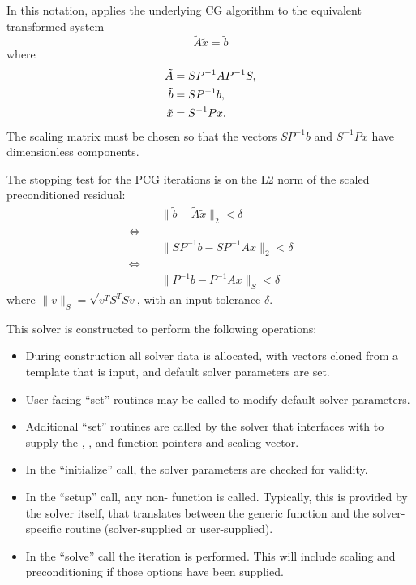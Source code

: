 In this notation, {\pcg} applies the underlying CG algorithm to the
equivalent transformed system
\begin{equation}
  \label{eq:transformed_linear_systemPCG}
  \tilde{A} \tilde{x} = \tilde{b}
\end{equation}
where
\begin{align}
  \notag
  \tilde{A} &= S P^{-1} A P^{-1} S,\\
  \label{eq:transformed_linear_system_componentsPCG}
  \tilde{b} &= S P^{-1} b,\\
  \notag
  \tilde{x} &= S^{-1} P x.
\end{align}
The scaling matrix must be chosen so that the vectors $SP^{-1}b$ and
$S^{-1}Px$ have dimensionless components.

The stopping test for the PCG iterations is on the L2 norm of the
scaled preconditioned residual:
\begin{align*}
  &\| \tilde{b} - \tilde{A} \tilde{x} \|_2  <  \delta\\
  \Leftrightarrow\quad &\\
  &\| S P^{-1} b - S P^{-1} A x \|_2  <  \delta\\
  \Leftrightarrow\quad &\\
  &\| P^{-1} b - P^{-1} A x \|_S  <  \delta
\end{align*}
where $\| v \|_S = \sqrt{v^T S^T S v}$, with an input tolerance $\delta$.

This solver is constructed to perform the following operations:
\begin{itemize}
\item During construction all {\nvector} solver data is allocated,
  with vectors cloned from a template {\nvector} that is input, and
  default solver parameters are set.
\item User-facing ``set'' routines may be called to modify default
  solver parameters.
\item Additional ``set'' routines are called by the {\sundials} solver
  that interfaces with {\sunlinsolpcg} to supply the
  , , and  function pointers and
   scaling vector.
\item In the ``initialize'' call, the solver parameters are checked
  for validity.
\item In the ``setup'' call, any non-  function is
  called.  Typically, this is provided by the {\sundials} solver
  itself, that translates between the generic  function and
  the solver-specific routine (solver-supplied or user-supplied).
\item In the ``solve'' call the {\pcg} iteration is performed.  This
  will include scaling and preconditioning if those options have been
  supplied.
\end{itemize}

